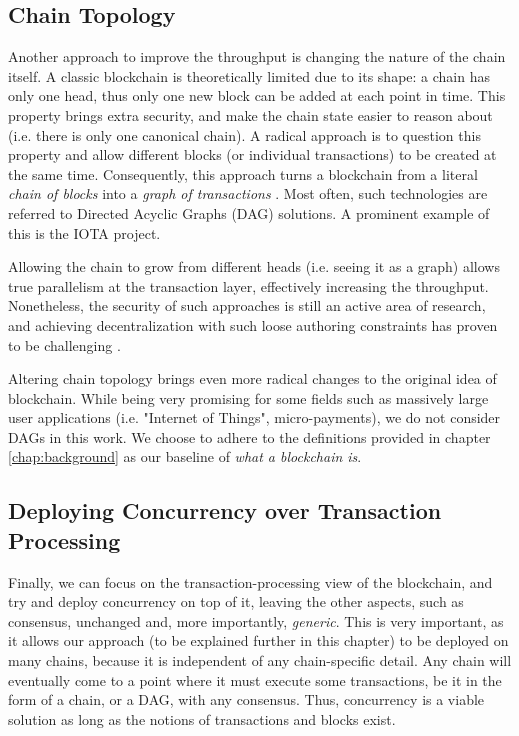 \subsection{Chain Topology}

Another approach to improve the throughput is changing the nature of the chain itself. A classic
blockchain is theoretically limited due to its shape: a chain has only one head, thus only one new
block can be added at each point in time. This property brings extra security, and make the chain
state easier to reason about (i.e. there is only one canonical chain). A radical approach is to
question this property and allow different blocks (or individual transactions) to be created at the
same time. Consequently, this approach turns a blockchain from a literal \textit{chain of blocks}
into a \textit{graph of transactions} \cite{pervezComparativeAnalysisDAGBased2018}. Most often, such
technologies are referred to Directed Acyclic Graphs (DAG) solutions. A prominent example of this is
the IOTA project\cite{mIOTANextGenerationBlock2018}.

Allowing the chain to grow from different heads (i.e. seeing it as a graph) allows true parallelism
at the transaction layer, effectively increasing the throughput. Nonetheless, the security of such
approaches is still an active area of research, and achieving decentralization with such loose
authoring constraints has proven to be challenging \cite{sompolinskySPECTREFastScalable2016}.

Altering chain topology brings even more radical changes to the original idea of blockchain.
While being very promising for some fields such as massively large user applications (i.e. "Internet
of Things", micro-payments), we do not consider DAGs in this work. We choose to adhere to the
definitions provided in chapter \ref{chap:background} as our baseline of \textit{what a blockchain
is}.

\subsection{Deploying Concurrency over Transaction Processing}
\label{chap_approach:subsec:out_of_box_concurrency}

Finally, we can focus on the transaction-processing view of the blockchain, and try and deploy
concurrency on top of it, leaving the other aspects, such as consensus, unchanged and, more
importantly, \textit{generic}. This is very important, as it allows our approach (to be explained
further in this chapter) to be deployed on many chains, because it is independent of any
chain-specific detail. Any chain will eventually come to a point where it must execute some
transactions, be it in the form of a chain, or a DAG, with any consensus. Thus, concurrency is a
viable solution as long as the notions of transactions and blocks exist.

